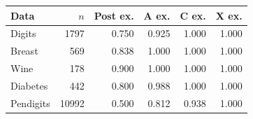 \begin{tabular}{lrrrrr}
\toprule
Data & $n$ & Post ex. & A ex. & C ex. & X ex.\\
\midrule
Digits & 1797 & 0.750 & 0.925 & 1.000 & 1.000\\
Breast & 569 & 0.838 & 1.000 & 1.000 & 1.000\\
Wine & 178 & 0.900 & 1.000 & 1.000 & 1.000\\
Diabetes & 442 & 0.800 & 0.988 & 1.000 & 1.000\\
Pendigits & 10992 & 0.500 & 0.812 & 0.938 & 1.000\\
\bottomrule
\end{tabular}

